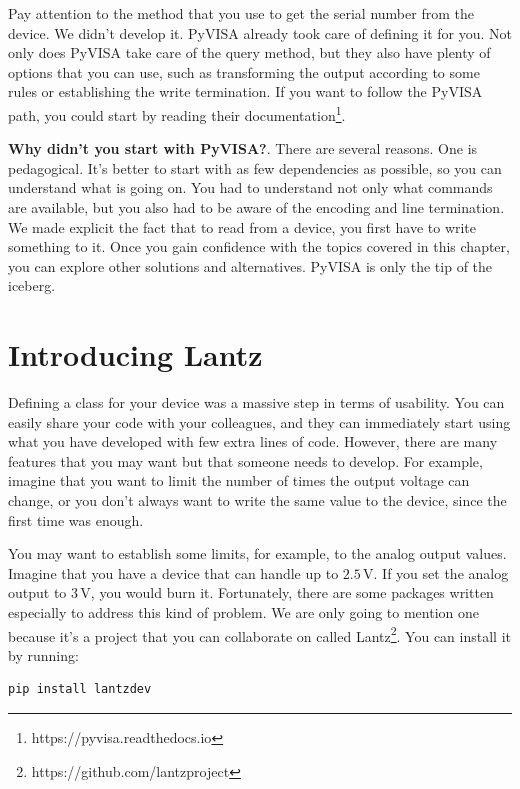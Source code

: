 Pay attention to the  method that you use to get the serial number from the device. We didn't develop it. PyVISA already took care of defining it for you. Not only does PyVISA take care of the query method, but they also have plenty of options that you can use, such as transforming the output according to some rules or establishing the write termination. If you want to follow the PyVISA path, you could start by reading their documentation\footnote{https://pyvisa.readthedocs.io}.

\textbf{Why didn't you start with PyVISA?}. There are several reasons. One is pedagogical. It's better to start with as few dependencies as possible, so you can understand what is going on. You had to understand not only what commands are available, but you also had to be aware of the encoding and line termination. We made explicit the fact that to read from a device, you first have to write something to it. Once you gain confidence with the topics covered in this chapter, you can explore other solutions and alternatives. PyVISA is only the tip of the iceberg.

\section{Introducing Lantz}\label{sec:lantz}
Defining a class for your device was a massive step in terms of usability. You can easily share your code with your colleagues, and they can immediately start using what you have developed with few extra lines of code. However, there are many features that you may want but that someone needs to develop. For example, imagine that you want to limit the number of times the output voltage can change, or you don't always want to write the same value to the device, since the first time was enough.

You may want to establish some limits, for example, to the analog output values. Imagine that you have a device that can handle up to $2.5\,\textrm{V}$. If you set the analog output to $3\,\textrm{V}$, you would burn it. Fortunately, there are some packages written especially to address this kind of problem. We are only going to mention one because it's a project that you can collaborate on called Lantz\footnote{https://github.com/lantzproject}. You can install it by running:

\begin{verbatim}
pip install lantzdev
\end{verbatim}



